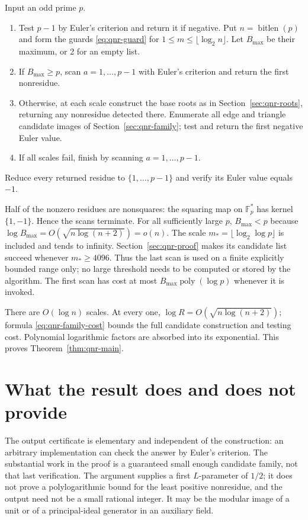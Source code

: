 \begin{algorithm}
\label{alg:qnr-full}
Input an odd prime $p$.
\begin{enumerate}
\item Test $p-1$ by Euler's criterion and return it if negative.
      Put $n=\operatorname{bitlen}(p)$ and form the guards
      \eqref{eq:qnr-guard} for
      $1\leq m\leq\lfloor\log_2n\rfloor$.
      Let $B_{\max}$ be their maximum, or 2 for an empty list.
\item If $B_{\max}\geq p$, scan $a=1,\ldots,p-1$ with Euler's
      criterion and return the first nonresidue.
\item Otherwise, at each scale construct the base roots as in
      Section~\ref{sec:qnr-roots}, returning any nonresidue detected
      there.  Enumerate all edge and triangle candidate images of
      Section~\ref{sec:qnr-family}; test and return the first negative
      Euler value.
\item If all scales fail, finish by scanning $a=1,\ldots,p-1$.
\end{enumerate}
Reduce every returned residue to $\{1,\ldots,p-1\}$ and verify its
Euler value equals $-1$.
\end{algorithm}

Half of the nonzero residues are nonsquares: the squaring map on
$\mathbb F_p^*$ has kernel $\{1,-1\}$.  Hence the scans terminate.
For all sufficiently large $p$, $B_{\max}<p$ because
$\log B_{\max}=O(\sqrt{n\log(n+2)})=o(n)$.
The scale $m_* =\lfloor\log_2\log p\rfloor$ is included and tends
to infinity.  Section~\ref{sec:qnr-proof} makes its candidate list
succeed whenever $m_*\geq4096$.  Thus the last scan is used on a
finite explicitly bounded range only; no large threshold needs to be
computed or stored by the algorithm.
The first scan has cost at most
$B_{\max}\operatorname{poly}(\log p)$ whenever it is invoked.

There are $O(\log n)$ scales.  At every one,
$\log R=O(\sqrt{n\log(n+2)})$; formula
\eqref{eq:qnr-family-cost} bounds the full candidate construction and
testing cost.  Polynomial logarithmic factors are absorbed into its
exponential.  This proves Theorem~\ref{thm:qnr-main}.

\section{What the result does and does not provide}

The output certificate is elementary and independent of the
construction: an arbitrary implementation can check the answer by
Euler's criterion.  The substantial work in the proof is a guaranteed
small enough candidate family, not that last verification.
The argument supplies a first $L$-parameter of $1/2$; it does not prove a
polylogarithmic bound for the least positive nonresidue, and the output
need not be a small rational integer.  It may be the modular image of a
unit or of a principal-ideal generator in an auxiliary field.


